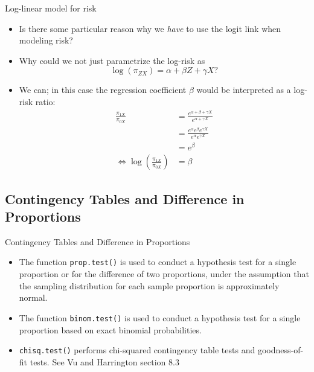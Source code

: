 \documentclass[10pt]{beamer}\usepackage[]{graphicx}\usepackage[]{color}
\begin{document}
\begin{frame}[fragile]{Log-linear model for risk}
	\begin{itemize}
		\item Is there some particular reason why we \textit{have} to use the logit link when modeling risk?
		\item Why could we not just parametrize the log-risk as
		$$
		\log(\pi_{ZX}) = \alpha + \beta Z + \gamma X ?
		$$
		\item We can; in this case the regression coefficient $\beta$ would be interpreted as a log-risk ratio:
		$$\begin{aligned}
		\frac{\pi_{1 X}}{\pi_{0 X}} &=\frac{e^{\alpha+\beta+\gamma X}}{e^{\alpha+\gamma X}} \\
		&=\frac{e^{\alpha} e^{\beta} e^{\gamma X}}{e^{\alpha} e^{\gamma X}} \\
		&=e^{\beta} \\
		\Leftrightarrow \log \left(\frac{\pi_{1 X}}{\pi_{0 X}}\right) &=\beta
		\end{aligned}$$
	\end{itemize}
\end{frame}

\subsection{Contingency Tables and Difference in Proportions}

\begin{frame}{Contingency Tables and Difference in Proportions}
	\begin{itemize}
		\item The function \texttt{prop.test()} is used to conduct a hypothesis test for a single proportion or for the difference of two proportions, under the assumption that the sampling distribution for each sample proportion is approximately normal.
		\item The function \texttt{binom.test()} is used to conduct a hypothesis test for a single proportion based on exact binomial probabilities.
		\item \texttt{chisq.test()} performs chi-squared contingency table tests and goodness-of-fit tests. See Vu and Harrington section 8.3		
	\end{itemize}
\end{frame}
\end{document}
